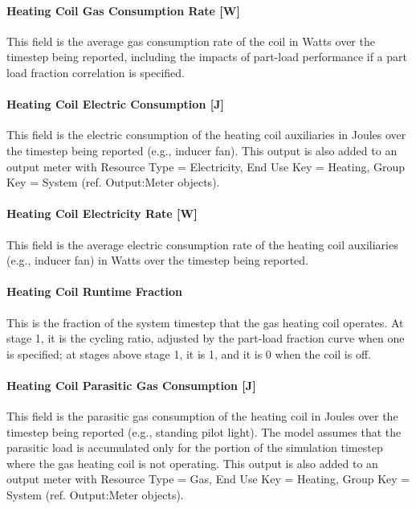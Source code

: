 \paragraph{Heating Coil Gas Consumption Rate {[}W{]}}\label{heating-coil-gas-consumption-rate-w}

This field is the average gas consumption rate of the coil in Watts over the timestep being reported, including the impacts of part-load performance if a part load fraction correlation is specified.

\paragraph{Heating Coil Electric Consumption {[}J{]}}\label{heating-coil-electric-consumption-j-1}

This field is the electric consumption of the heating coil auxiliaries in Joules over the timestep being reported (e.g., inducer fan). This output is also added to an output meter with Resource Type = Electricity, End Use Key = Heating, Group Key = System (ref. Output:Meter objects).

\paragraph{Heating Coil Electricity Rate {[}W{]}}\label{heating-coil-electric-power-w-4}

This field is the average electric consumption rate of the heating coil auxiliaries (e.g., inducer fan) in Watts over the timestep being reported.

\paragraph{Heating Coil Runtime Fraction}\label{heating-coil-runtime-fraction-gas-multistage}

This is the fraction of the system timestep that the gas heating coil operates. At stage 1, it is the cycling ratio, adjusted by the part-load fraction curve when one is specified; at stages above stage 1, it is 1, and it is 0 when the coil is off.

\paragraph{Heating Coil Parasitic Gas Consumption {[}J{]}}\label{heating-coil-parasitic-gas-consumption-j}

This field is the parasitic gas consumption of the heating coil in Joules over the timestep being reported (e.g., standing pilot light). The model assumes that the parasitic load is accumulated only for the portion of the simulation timestep where the gas heating coil is not operating. This output is also added to an output meter with Resource Type = Gas, End Use Key = Heating, Group Key = System (ref. Output:Meter objects).

